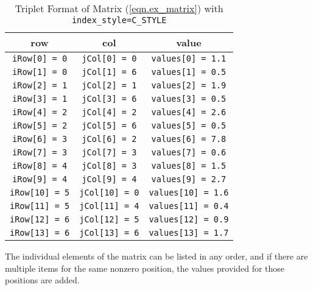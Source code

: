 \documentclass[10pt]{article}
\begin{document}
\begin{footnotesize}
\begin{table}[ht]
\begin{center}
\label{tab.fortran_triplet}
\end{center}
\end{table}
\begin{table}[ht]%
\begin{center}
\begin{tabular}{c c c}
row     		&       col     	&       value 			    \\
\hline
{\tt iRow[0] = 0}       &       {\tt jCol[0] = 0}       & {\tt values[0] = 1.1}     \\
{\tt iRow[1] = 0}       &       {\tt jCol[1] = 6}       & {\tt values[1] = 0.5}     \\
{\tt iRow[2] = 1}       &       {\tt jCol[2] = 1}       & {\tt values[2] = 1.9}     \\
{\tt iRow[3] = 1}       &       {\tt jCol[3] = 6}       & {\tt values[3] = 0.5}     \\
{\tt iRow[4] = 2}       &       {\tt jCol[4] = 2}       & {\tt values[4] = 2.6}     \\
{\tt iRow[5] = 2}       &       {\tt jCol[5] = 6}       & {\tt values[5] = 0.5}     \\
{\tt iRow[6] = 3}       &       {\tt jCol[6] = 2}       & {\tt values[6] = 7.8}     \\
{\tt iRow[7] = 3}       &       {\tt jCol[7] = 3}       & {\tt values[7] = 0.6}     \\
{\tt iRow[8] = 4}       &       {\tt jCol[8] = 3}       & {\tt values[8] = 1.5}     \\
{\tt iRow[9] = 4}       &       {\tt jCol[9] = 4}       & {\tt values[9] = 2.7}     \\
{\tt iRow[10] = 5}      &       {\tt jCol[10] = 0}      & {\tt values[10] = 1.6}     \\
{\tt iRow[11] = 5}      &       {\tt jCol[11] = 4}      & {\tt values[11] = 0.4}     \\
{\tt iRow[12] = 6}      &       {\tt jCol[12] = 5}      & {\tt values[12] = 0.9}     \\
{\tt iRow[13] = 6}      &       {\tt jCol[13] = 6}      & {\tt values[13] = 1.7}
\end{tabular}
\caption{Triplet Format of Matrix (\ref{eqn.ex_matrix}) 
with {\tt index\_style=C\_STYLE}}
\label{tab.c_triplet}
\end{center}
\end{table}
\end{footnotesize}
The individual elements of the matrix can be listed in any order, and
if there are multiple items for the same nonzero position, the values
provided for those positions are added.
\end{document}
